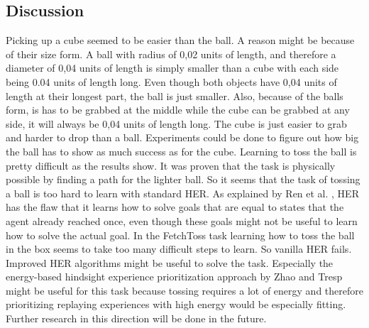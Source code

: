 \subsection{Discussion}

Picking up a cube seemed to be easier than the ball. A reason might be because of their size form. A ball with radius of 0,02 units of length, and therefore a diameter of 0,04 units of length is simply smaller than a cube with each side being 0.04 units of length long. Even though both objects have 0,04 units of length at their longest part, the ball is just smaller. Also, because of the balls form, is has to be grabbed at the middle while the cube can be grabbed at any side, it will always be 0,04 units of length long. The cube is just easier to grab and harder to drop than a ball. Experiments could be done to figure out how big the ball has to show as much success as for the cube.
\newline 
Learning to toss the ball is pretty difficult as the results show. It was proven that the task is physically possible by finding a path for the lighter ball. So it seems that the task of tossing a ball is too hard to learn with standard HER.
\newline
As explained by Ren et al. \cite{hgg}, HER has the flaw that it learns how to solve goals that are equal to states that the agent already reached once, even though these goals might not be useful to learn how to solve the actual goal. In the FetchToss task learning how to toss the ball in the box seems to take too many difficult steps to learn. So vanilla HER fails. Improved HER algorithms might be useful to solve the task. Especially the energy-based hindsight experience prioritization approach by Zhao and Tresp \cite{energyher} might be useful for this task because tossing requires a lot of energy and therefore prioritizing replaying experiences with high energy would be especially fitting.
Further research in this direction will be done in the future.



